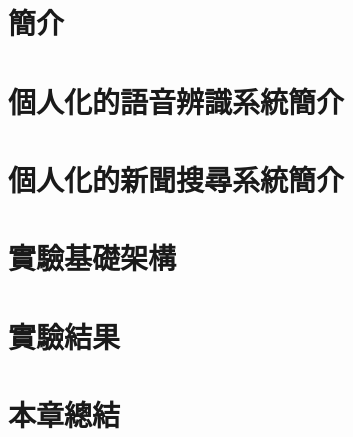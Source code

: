 \section{簡介}

\section{個人化的語音辨識系統簡介}

\section{個人化的新聞搜尋系統簡介}

\section{實驗基礎架構}

\section{實驗結果}

\section{本章總結}
